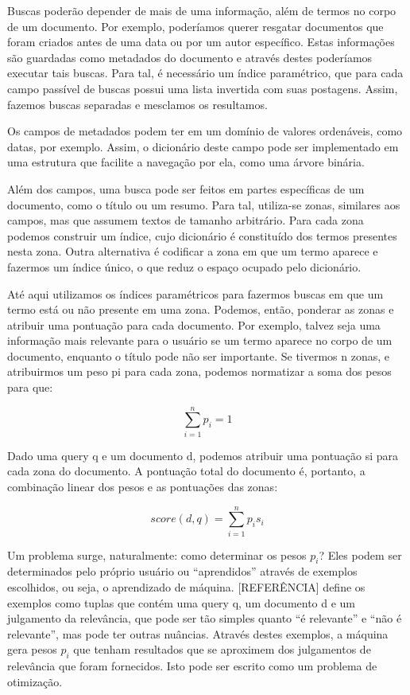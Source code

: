 Buscas poderão depender de mais de uma informação, além de termos no corpo de um documento. Por exemplo, poderíamos querer resgatar documentos que foram criados antes de uma data ou por um autor específico. Estas informações são guardadas como metadados do documento e através destes poderíamos executar tais buscas. Para tal, é necessário um índice paramétrico, que para cada campo passível de buscas possui uma lista invertida com suas postagens. Assim, fazemos buscas separadas e mesclamos os resultamos.

Os campos de metadados podem ter em um domínio de valores ordenáveis, como datas, por exemplo. Assim, o dicionário deste campo pode ser implementado em uma estrutura que facilite a navegação por ela, como uma árvore binária.

Além dos campos, uma busca pode ser feitos em partes específicas de um documento, como o título ou um resumo. Para tal, utiliza-se zonas, similares aos campos, mas que assumem textos de tamanho arbitrário. Para cada zona podemos construir um índice, cujo dicionário é constituído dos termos presentes nesta zona. Outra alternativa é codificar a zona em que um termo aparece e fazermos um índice único, o que reduz o espaço ocupado pelo dicionário.

Até aqui utilizamos os índices paramétricos para fazermos buscas em que um termo está ou não presente em uma zona. Podemos, então, ponderar as zonas e atribuir uma pontuação para cada documento. Por exemplo, talvez seja uma informação mais relevante para o usuário se um termo aparece no corpo de um documento, enquanto o título pode não ser importante. Se tivermos n zonas, e atribuirmos um peso pi para cada zona, podemos normatizar a soma dos pesos para que:

\begin{displaymath}
	\sum_{i=1}^{n} p_{i} = 1
\end{displaymath}

Dado uma query q e um documento d, podemos atribuir uma pontuação si para cada zona do documento. A pontuação total do documento é, portanto, a combinação linear dos pesos e as pontuações das zonas:

\begin{displaymath}
	score(d,q)= \sum_{i=1}^{n} p_{i} s_{i}
\end{displaymath}

Um problema surge, naturalmente: como determinar os pesos $p_{i}$? Eles podem ser determinados pelo próprio usuário ou “aprendidos” através de exemplos escolhidos, ou seja, o aprendizado de máquina. [REFERÊNCIA] define os exemplos como tuplas que contém uma query q, um documento d e um julgamento da relevância, que pode ser tão simples quanto “é relevante” e “não é relevante”, mas pode ter outras nuâncias. Através destes exemplos, a máquina gera pesos $p_{i}$ que tenham resultados que se aproximem dos julgamentos de relevância que foram fornecidos. Isto pode ser escrito como um problema de otimização.